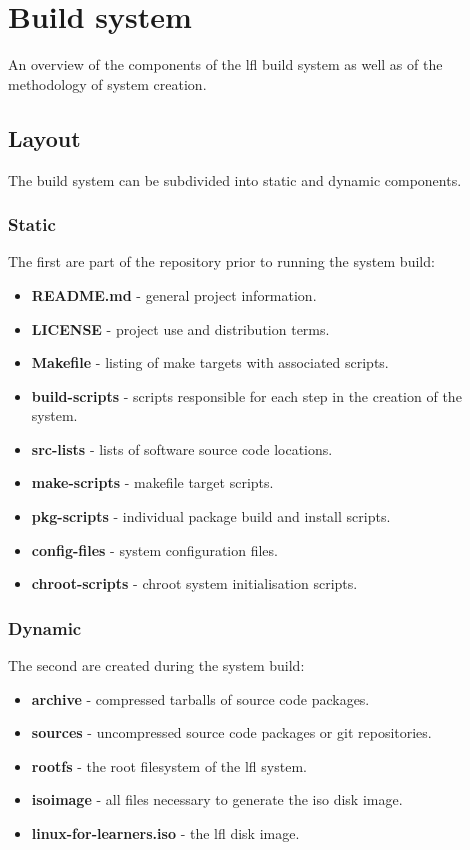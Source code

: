 \section{Build system}\label{Build system}

An overview of the components of the \gls{lfl} build system as well as of the methodology of system creation.

\subsection{Layout}

The build system can be subdivided into static and dynamic components.

\subsubsection{Static}

The first are part of the repository prior to running the system build:

\begin{itemize}
    \item \textbf{README.md} - general project information.
    \item \textbf{LICENSE} - project use and distribution terms.
    \item \textbf{Makefile} - listing of make targets with associated scripts.
    \item \textbf{build-scripts} - scripts responsible for each step in the creation of the system.
    \item \textbf{src-lists} - lists of software source code locations.
    \item \textbf{make-scripts} - makefile target scripts.
    \item \textbf{pkg-scripts} - individual package build and install scripts.
    \item \textbf{config-files} - system configuration files.
    \item \textbf{chroot-scripts} - chroot system initialisation scripts.
\end{itemize}

\subsubsection{Dynamic}

The second are created during the system build:

\begin{itemize}
    \item \textbf{archive} - compressed tarballs of source code packages.
    \item \textbf{sources} - uncompressed source code packages or git repositories.
    \item \textbf{rootfs} - the root filesystem of the \gls{lfl} system.
    \item \textbf{isoimage} - all files necessary to generate the iso disk image.
    \item \textbf{linux-for-learners.iso} - the \gls{lfl} disk image.
\end{itemize}

